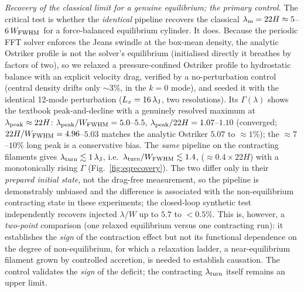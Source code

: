 \documentclass[usenatbib,twoside,twocolumn]{mnras}
\begin{document}
\emph{Recovery of the classical limit for a genuine equilibrium; the primary control.} The critical test is whether the \emph{identical} pipeline recovers the classical $\lambda_{\rm m}=22H\approx5$--$6\,W_{\rm FWHM}$ for a force-balanced equilibrium cylinder. It does. Because the periodic FFT solver enforces the Jeans swindle at the box-mean density, the analytic Ostriker profile is not the solver's equilibrium (initialised directly it breathes by factors of two), so we relaxed a pressure-confined Ostriker profile to hydrostatic balance with an explicit velocity drag, verified by a no-perturbation control (central density drifts only $\sim3\%$, in the $k=0$ mode), and seeded it with the identical 12-mode perturbation ($L_x=16\,\lambda_{\rm J}$, two resolutions). Its $\Gamma(\lambda)$ shows the textbook peak-and-decline with a genuinely resolved maximum at $\lambda_{\rm peak}\approx22H$: $\lambda_{\rm peak}/W_{\rm FWHM}=5.0$--$5.5$, $\lambda_{\rm peak}/22H=1.07$--$1.10$ (converged; $22H/W_{\rm FWHM}=4.96$--$5.03$ matches the analytic Ostriker $5.07$ to $\approx1\%$); the $\approx7$--$10\%$ long peak is a conservative bias. The \emph{same} pipeline on the contracting filaments gives $\lambda_{\rm turn}\lesssim1\,\lambda_{\rm J}$, i.e.\ $\lambda_{\rm turn}/W_{\rm FWHM}\lesssim1.4$, ($\approx0.4\times22H$) with a monotonically rising $\Gamma$ (Fig.~\ref{fig:eqrecovery}). The two differ only in their \emph{prepared initial state}, not the drag-free measurement, so the pipeline is demonstrably unbiased and the difference is associated with the non-equilibrium contracting state in these experiments; the closed-loop synthetic test independently recovers injected $\lambda/W$ up to $5.7$ to $<0.5\%$. This is, however, a \emph{two-point} comparison (one relaxed equilibrium versus one contracting run): it establishes the \emph{sign} of the contraction effect but not its functional dependence on the degree of non-equilibrium, for which a relaxation ladder, a near-equilibrium filament grown by controlled accretion, is needed to establish causation. The control validates the \emph{sign} of the deficit; the contracting $\lambda_{\rm turn}$ itself remains an upper limit.
\end{document}
